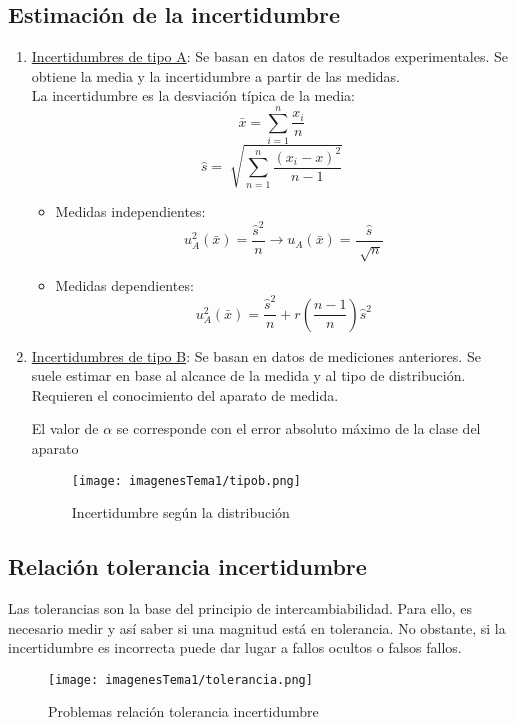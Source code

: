 \subsection{Estimación de la incertidumbre}
\begin{enumerate}
	\item \underline{Incertidumbres de tipo A}: Se basan en datos de resultados experimentales. Se obtiene la media y la incertidumbre a partir de las medidas.
	\\La incertidumbre es la desviación típica de la media:
	\[ \bar x = \sum_{i=1}^{n} \frac{x_i}{n} \]
	\[\hat{s}=\sqrt[]{\sum_{n=1}^n \frac{(x_i -x)^2}{n-1}} \]
	\begin{itemize}
		\item Medidas independientes:
		\[ u_A^2(\bar x) =  \frac{\hat{s}^2}{n} \rightarrow u_A(\bar x) =  \frac{\hat{s}}{\sqrt[]{n}}\]
		\item Medidas dependientes:
		\[ u_A^2(\bar x) =  \frac{\hat{s}^2}{n} + r \left({\frac{n-1}{n}}\right)\hat{s}^2\]
	\end{itemize}
	\item \underline{Incertidumbres de tipo B}: Se basan en datos de mediciones anteriores. Se suele estimar en base al alcance de la medida y al tipo de distribución. Requieren el conocimiento del aparato de medida.
	\begin{center}
	El valor de $\alpha$ se corresponde con el error absoluto máximo de la clase del aparato
\end{center}
		\begin{figure}[H]
		\centering
		\texttt{[image: imagenesTema1/tipob.png]}  
		\caption{Incertidumbre según la distribución}
		\label{fig:sample}
	\end{figure}
	
\end{enumerate}
\newpage
\subsection{Relación tolerancia incertidumbre}
Las tolerancias son la base del principio de intercambiabilidad. Para ello, es necesario medir y así saber si una magnitud está en tolerancia. No obstante, si la incertidumbre es incorrecta puede dar lugar a fallos ocultos o falsos fallos.
 \begin{figure} [H]
 	\centering
 	\texttt{[image: imagenesTema1/tolerancia.png]}  
 	\caption{Problemas relación tolerancia incertidumbre}
 	\label{fig:sample}
 	\end{figure}
 	
